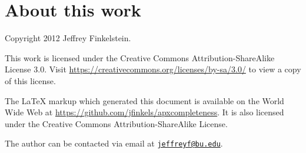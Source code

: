 \documentclass[]{article}
\newcommand{\email}[1]{\href{mailto:#1}{\nolinkurl{#1}}}
\begin{document}
\section*{About this work}

Copyright 2012 Jef{}frey Finkelstein.

This work is licensed under the Creative Commons Attribution-ShareAlike License 3.0.
Visit \mbox{\url{https://creativecommons.org/licenses/by-sa/3.0/}} to view a copy of this license.

The \LaTeX{} markup which generated this document is available on the World Wide Web at \mbox{\url{https://github.com/jfinkels/apxcompleteness}}.
It is also licensed under the Creative Commons Attribution-ShareAlike License.

The author can be contacted via email at \email{jeffreyf@bu.edu}.



\end{document}
